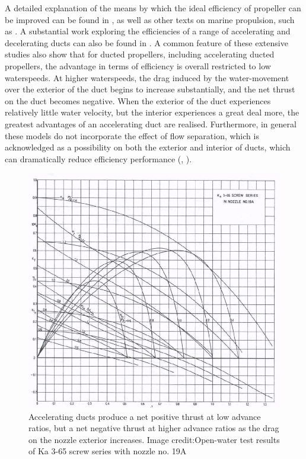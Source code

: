 \documentclass{article}\usepackage[]{graphicx}\usepackage[]{color}
\begin{document}
A detailed explanation of the means by which the ideal efficiency of propeller can be improved can be found in \cite[213-222]{lewis1988}, as well as other texts on marine propulsion, such as \cite{carlton2007}. A substantial work exploring the efficiencies of a range of accelerating and decelerating ducts can also be found in \cite{oosterveld1970}.  A common feature of these extensive studies also show that for ducted propellers, including accelerating ducted propellers, the advantage in terms of efficiency is overall restricted to low waterspeeds.  At higher waterspeeds, the drag induced by the water-movement over the exterior of the duct begins to increase substantially, and the net thrust on the duct becomes negative.  When the exterior of the duct experiences relatively little water velocity, but the interior experiences a great deal more, the greatest advantages of an accelerating duct are realised.  Furthermore, in general these models do not incorporate the effect of flow separation, which is acknowledged as a possibility on both the exterior and interior of ducts, which can dramatically reduce efficiency performance (\cite[20]{oosterveld1970}, \cite[214]{lewis1988}).

\begin{figure}
\includegraphics[width=\textwidth]{DuctedEfficiency.png}
\caption{Accelerating ducts produce a net positive thrust at low advance ratios, but a net negative thrust at higher advance ratios as the drag on the nozzle exterior increases. Image credit:Open-water test results of Ka 3-65 screw series with nozzle no. 19A \parencite{oosterveld1970}}
\label{fig:DuctedEfficiency.png}
\end{figure}
\end{document}

